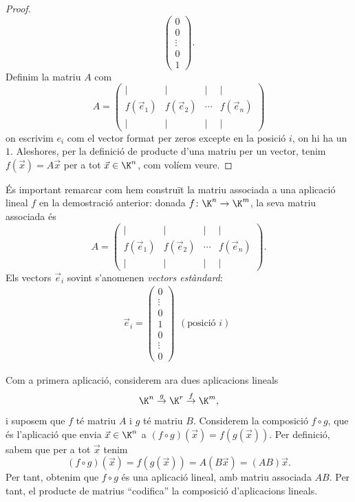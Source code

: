 \begin{proof}
\[\begin{pmatrix}
	0\\0\\\vdots\\0\\1
	\end{pmatrix}.
	\]
	Definim la matriu $A$ com
	\[
	A=\begin{pmatrix}
	\mid & \mid &\mid & \mid\\
	f(\vec e_1) & f(\vec e_2) &\cdots&f(\vec e_n)\\
	\mid & \mid &\mid & \mid
	\end{pmatrix}
	\]
	on escrivim $e_i$ com el vector format per zeros excepte en la posició $i$, on hi ha un $1$. Aleshores, per la definició de producte d'una matriu per un vector, tenim $f(\vec x) = A\vec x$ per a tot $\vec x\in \K^n$, com volíem veure.
\end{proof}

És important remarcar com hem construït la matriu associada a una aplicació lineal $f$ en la demostració anterior: donada $f\colon \K^n\rightarrow \K^m$, la seva matriu associada és
\[
A=\begin{pmatrix}
\mid & \mid &\mid & \mid\\
f(\vec e_1) & f(\vec e_2) &\cdots&f(\vec e_n)\\
\mid & \mid &\mid & \mid
\end{pmatrix}.
\]
Els vectors $\vec e_i$ sovint s'anomenen \emph{vectors estàndard}:
\[
\vec e_i = \begin{pmatrix}
0\\\vdots\\0\\1\\0\\\vdots\\0
\end{pmatrix}
\begin{matrix}
\phantom{0}\\\phantom{\vdots}\\\phantom{0}\\(\textrm{posició } i)\\\phantom{0}\\\phantom{\vdots}\\\phantom{0}
\end{matrix}
\]

Com a primera aplicació, considerem ara dues aplicacions lineals
\[
\K^n \stackrel{g}{\rightarrow} \K^r \stackrel{f}{\rightarrow} \K^m,
\]
i suposem que $f$ té matriu $A$ i $g$ té matriu $B$. Considerem la composició $f\circ g$, que és l'aplicació que envia $\vec x\in \K^n$ a $(f\circ g)(\vec x) = f(g(\vec x))$. Per definició, sabem que per a tot $\vec x$ tenim
\[
(f\circ g)(\vec x) = f(g(\vec x)) = A(B\vec x) = (AB)\vec x. 
\]
Per tant, obtenim que $f\circ g$ és una aplicació lineal, amb matriu associada $AB$. Per tant, el producte de matrius ``codifica'' la composició d'aplicacions lineals.

